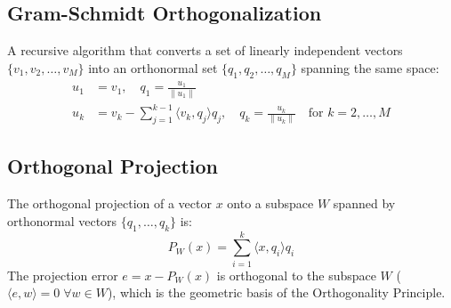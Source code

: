 \documentclass[12pt,a4paper]{article}
\begin{document}
\subsection{Gram-Schmidt Orthogonalization}
A recursive algorithm that converts a set of linearly independent vectors $\{v_1, v_2, \dots, v_M\}$ into an orthonormal set $\{q_1, q_2, \dots, q_M\}$ spanning the same space:
\begin{align}
  u_1 &= v_1, \quad q_1 = \frac{u_1}{\|u_1\|} \nonumber \\
  u_k &= v_k - \sum_{j=1}^{k-1} \langle v_k, q_j \rangle q_j, \quad q_k = \frac{u_k}{\|u_k\|} \quad \text{for } k=2, \dots, M
\end{align}

\subsection{Orthogonal Projection}
The orthogonal projection of a vector $x$ onto a subspace $W$ spanned by orthonormal vectors $\{q_1, \dots, q_k\}$ is:
\begin{equation}
  P_W(x) = \sum_{i=1}^k \langle x, q_i \rangle q_i
\end{equation}
The projection error $e = x - P_W(x)$ is orthogonal to the subspace $W$ ($\langle e, w \rangle = 0 \; \forall w \in W$), which is the geometric basis of the Orthogonality Principle.

\begin{tcolorbox}[tikzbox, title={Vector Projection Geometry}]
\centering
{}
\end{tcolorbox}
\end{document}

